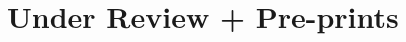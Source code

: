 \documentclass[letterpaper]{deedy-resume} %
\begin{document}
{\begin{etaremune}[itemsep=0.1cm]
\end{etaremune}








  




\section{Under Review + Pre-prints}

}
\end{document}
